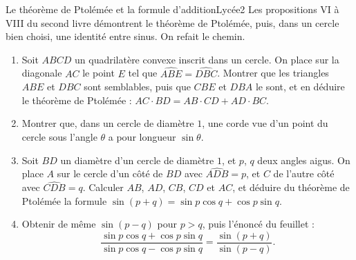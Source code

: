 \documentclass[11pt,a4paper]{article}
\begin{document}
\begin{exercice}{Le théorème de Ptolémée et la formule d'addition}{Lycée}{2}
Les propositions VI à VIII du second livre démontrent le théorème de Ptolémée,
puis, dans un cercle bien choisi, une identité entre sinus. On refait le
chemin.


\begin{enumerate}
\item Soit $ABCD$ un quadrilatère convexe inscrit dans un cercle. On place sur
  la diagonale $AC$ le point $E$ tel que $\widehat{ABE} = \widehat{DBC}$.
  Montrer que les triangles $ABE$ et $DBC$ sont semblables, puis que $CBE$ et
  $DBA$ le sont, et en déduire le théorème de Ptolémée :
  $AC \cdot BD = AB \cdot CD + AD \cdot BC$.
\item Montrer que, dans un cercle de diamètre $1$, une corde vue d'un point du
  cercle sous l'angle $\theta$ a pour longueur $\sin\theta$.
\item Soit $BD$ un diamètre d'un cercle de diamètre $1$, et $p$, $q$ deux angles
  aigus. On place $A$ sur le cercle d'un côté de $BD$ avec
  $\widehat{ADB} = p$, et $C$ de l'autre côté avec $\widehat{CDB} = q$. Calculer
  $AB$, $AD$, $CB$, $CD$ et $AC$, et déduire du théorème de Ptolémée la formule
  $\sin(p+q) = \sin p\cos q + \cos p \sin q$.
\item Obtenir de même $\sin(p-q)$ pour $p > q$, puis l'énoncé du feuillet :
  \[
  \frac{\sin p\cos q + \cos p\sin q}{\sin p\cos q - \cos p\sin q}
  = \frac{\sin(p+q)}{\sin(p-q)} .
  \]
\end{enumerate}
\end{exercice}
\end{document}
